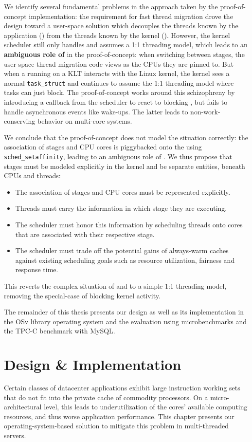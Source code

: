 \documentclass[12pt,a4paper]{book}
\begin{document}
We identify several fundamental problems in the approach taken by the proof-of-concept implementation:
the requirement for fast thread migration drove the design toward a user-space solution which decouples the threads known by the application (\ults) from the threads known by the kernel (\klts).
However, the kernel scheduler still only handles \klts and assumes a 1:1 threading model, which leads to an \textbf{ambiguous role of \klts} in the proof-of-concept:
when switching between stages, the user space thread migration code views \klts as the CPUs they are pinned to.
But when a \ult running on a KLT interacts with the Linux kernel, the kernel sees a normal \texttt{task\_struct} and continues to assume the 1:1 threading model where tasks can just block.
The proof-of-concept works around this schizophreny by introducing a callback from the scheduler to react to blocking \klts, but fails to handle asynchronous events like wake-ups.
The latter leads to non-work-conserving behavior on multi-core systems.

We conclude that the proof-of-concept does not model the situation correctly: the association of stages and CPU cores is piggybacked onto the \klts using \texttt{sched\_setaffinity}, leading to an ambiguous role of \klts.
We thus propose that stages must be modeled explicitly in the kernel and be separate entities, beneath CPUs and threads:
\begin{itemize}%
    \item The association of stages and CPU cores must be represented explicitly.
    \item Threads must carry the information in which stage they are executing.
    \item The scheduler must honor this information by scheduling threads onto cores that are associated with their respective stage.
    \item The scheduler must trade off the potential gains of always-warm caches against existing scheduling goals such as resource utilization, fairness and response time.
\end{itemize}%
This reverts the complex situation of \ults and \klts to a simple 1:1 threading model, removing the special-case of blocking kernel activity.

The remainder of this thesis presents our design as well as its implementation in the OSv library operating system and the evaluation using microbenchmarks and the TPC-C benchmark with MySQL.

\chapter{Design \& Implementation}\label{ch:di}
Certain classes of datacenter applications exhibit large instruction working sets that do not fit into the private cache of commodity processors.
On a micro-architectural level, this leads to underutilization of the cores' available computing resources, and thus worse application performance.
This chapter presents our operating-system-based solution to mitigate this problem in multi-threaded servers.
\end{document}
